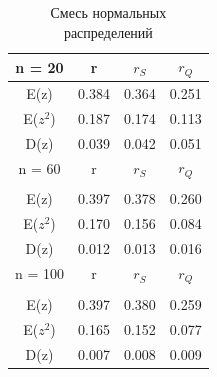 \documentclass[a4]{article}
\begin{document}
		\begin{table}[h!]
			
			\caption{Смесь нормальных распределений}
			\label{tab:my_label}
			\begin{center}
				\vspace{5mm}
				\begin{tabular}{|c|c|c|c|}
					\hline
					n = 20 & r & $r_S$ & $r_Q$ \\
					\hline
					E(z) & 0.384 & 0.364 & 0.251\\
					\hline
					E($z^2$)   & 0.187 & 0.174 & 0.113\\
					\hline
					D(z)   & 0.039 & 0.042 & 0.051 \\
					\hline
					n = 60 & r & $r_S$ & $r_Q$ \\
					\hline\\
					\hline
					E(z) & 0.397 & 0.378 & 0.260\\
					\hline
					E($z^2$)   & 0.170 & 0.156 & 0.084\\
					\hline
					D(z)   & 0.012 & 0.013 & 0.016 \\
					\hline
					n = 100 & r & $r_S$ & $r_Q$ \\
					\hline\\
					\hline
					E(z) & 0.397 & 0.380 & 0.259\\
					\hline
					E($z^2$)   & 0.165 & 0.152 & 0.077\\
					\hline
					D(z)   & 0.007 & 0.008 & 0.009 \\
					\hline
				\end{tabular}
				
			\end{center}
			
		\end{table}
	\newpage
\end{document}
